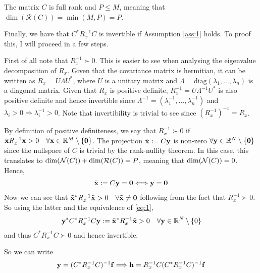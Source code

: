 \documentclass{article}
\begin{document}
\begin{enumerate}[label=(\roman*)]
        \begin{assumption}
            The matrix $C$ is full rank and $P\leq M$, meaning that $\dim (\mathcal{R}(C)) = \min(M,P)= P$.
            \label{ass:1}
        \end{assumption}
        
        Finally, we have that $C^* R_x^{-1} C$ is invertible if Assumption \ref{ass:1} holds. To proof this, I will proceed in a few steps.
        
        First of all note that $R_x^{-1} \succ 0$. This is easier to see when analysing the eigenvalue decomposition of $R_x$. Given that the covariance matrix is hermitian, it can be written as $R_x = U \Lambda U^*$, where $U$ is a unitary matrix and $\Lambda = \text{diag}(\lambda_1,\dots, \lambda_n)$ is a diagonal matrix. Given that $R_x$ is positive definite, $R_x^{-1} = U \Lambda^{-1} U^*$ is also positive definite and hence invertible since $\Lambda^{-1} = (\lambda_1^{-1},\dots, \lambda_n^{-1})$ and $\lambda_i > 0 \Longrightarrow \lambda_i^{-1} > 0$. Note that invertibility is trivial to see since $(R_x^{-1})^{-1}=R_x$.
        
        By definition of positive definiteness, we say that $R_x^{-1}\succ 0$ if $\mathbf{x} R_x^{-1} \mathbf{x} > 0\quad \forall \mathbf{x} \in \mathbb{R}^M \setminus \{\mathbf{0}\}$. The projection $\tilde{\mathbf{x}} := C \mathbf{y}$ is non-zero $\forall \mathbf{y} \in \mathbb{R}^N \setminus \{\mathbf{0}\}$ since the nullspace of $C$ is trivial by the rank-nullity theorem. In this case, this translates to $\dim(\mathcal{N}(C))+ \dim(\mathcal{R}(C))=P$, meaning that $\dim(\mathcal{N}(C))=0$. Hence,
        \begin{align}
        \tilde{\mathbf{x}}  := C \mathbf{y} = \mathbf{0} \Longleftrightarrow \mathbf{y} = \mathbf{0} \label{eq:1}
        \end{align}
        Now we can see that $\tilde{\mathbf{x}}^* R_x^{-1} \tilde{\mathbf{x}} > 0\quad \forall \tilde{\mathbf{x}} \neq \mathbf{0}$ following from the fact that $R_x^{-1} \succ 0$. So using the latter and the equivalence of \eqref{eq:1},
        \begin{align}
        \mathbf{y}^* C^* R_x^{-1} C \mathbf{y}:=\tilde{\mathbf{x}}^* R_x^{-1} \tilde{\mathbf{x}} > 0\quad \forall \mathbf{y} \in \mathbb{R}^N \setminus \{0\}
        \end{align}
        and thus $C^* R_x^{-1} C \succ 0$ and hence invertible.
        
        So we can write
        \begin{align}
            \mathbf{y} = (C^* R_x^{-1} C)^{-1} \mathbf{f} \Longrightarrow \mathbf{h} = R_x^{-1} C (C^* R_x^{-1} C)^{-1} \mathbf{f}
        \end{align}
        

\end{enumerate}
\end{document}
